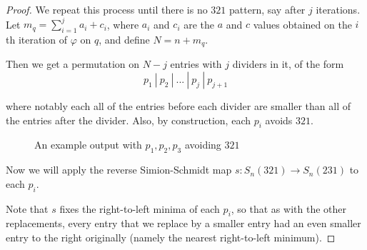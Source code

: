 \documentclass[11pt]{amsart}
\theoremstyle{remark}
\numberwithin{equation}{section}
\begin{document}
\begin{proof}
We repeat this process until there is no $321$ pattern, say after $j$ iterations. Let $m_q =\sum_{i=1}^j a_i + c_i$, where $a_i$ and $c_i$ are the $a$ and $c$ values obtained on the $i$th iteration of $\varphi$ on $q$, and define $N = n + m_q$. 

Then we get a permutation on $N - j$ entries with $j$ dividers in it, of the form
\[
p_1 \ | \ p_2 \ | \ ... \ | \ p_{j} \ | \ p_{j+1}
\]

where notably each all of the entries before each divider are smaller than all of the entries after the divider. Also, by construction, each $p_i$ avoids $321$.

\begin{figure}[H]
    \centering
    \caption{An example output with $p_1,p_2,p_3$ avoiding $321$}
\end{figure}


\vspace{10pt}
Now we will apply the reverse Simion-Schmidt map $s:S_n(321)\rightarrow S_n(231)$ to each $p_i$. 

Note that $s$ fixes the right-to-left minima of each $p_i$, so that as with the other replacements, every entry that we replace by a smaller entry had an even smaller entry to the right originally (namely the nearest right-to-left minimum).


\end{proof}
\end{document}
